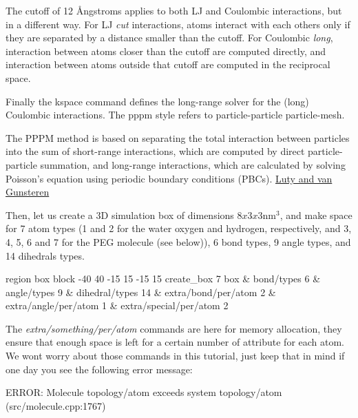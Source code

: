 \begin{tcolorbox}[colback=mylightblue!5!white,colframe=mylightblue!75!black,title=About cutoff in molecular dynamics]
The cutoff of 12 Ångstroms applies to both LJ and Coulombic
interactions, but in a different way. For LJ \textit{cut}
interactions, atoms interact with each others only if they
are separated by a distance smaller than the cutoff. For
Coulombic \textit{long}, interaction between atoms closer than
the cutoff are computed directly, and interaction between
atoms outside that cutoff are computed in the reciprocal
space.
\end{tcolorbox}

\noindent Finally the kspace command defines the long-range solver for the (long)
Coulombic interactions. The pppm style refers to
particle-particle particle-mesh.

\begin{tcolorbox}[colback=mylightblue!5!white,colframe=mylightblue!75!black,title=Background Information (optional) -- About PPPM]
The PPPM
method is based on separating the total interaction
between particles into the sum of short-range
interactions, which are computed by direct
particle-particle summation, and long-range interactions,
which are calculated by solving Poisson's equation using
periodic boundary conditions (PBCs). 
\href{https://doi.org/10.1021/jp9518623}{Luty and van Gunsteren}
\end{tcolorbox}

\noindent Then, let us create a 3D simulation box of dimensions $8 x 3 x 3 \text{nm}^3$,
and make space for 7 atom types (1 and 2 for
the water oxygen and hydrogen, respectively, and 3, 4, 5, 6
and 7 for the PEG molecule (see below)), 6 bond types, 9
angle types, and 14 dihedrals types.

\begin{lcverbatim}
region box block -40 40 -15 15 -15 15
create_box 7 box &
bond/types 6 &
angle/types 9 &
dihedral/types 14 &
extra/bond/per/atom 2 &
extra/angle/per/atom 1 &
extra/special/per/atom 2
\end{lcverbatim}

\noindent \begin{tcolorbox}[colback=mylightblue!5!white,colframe=mylightblue!75!black,title=About extra per atom commands]
The \textit{extra/something/per/atom} commands are here for
memory allocation, they ensure that enough space is left for a
certain number of attribute for each atom. We wont worry
about those commands in this tutorial, just keep that in mind if one day you see the following
error message:
\begin{lcverbatim}
ERROR: Molecule topology/atom exceeds system topology/atom (src/molecule.cpp:1767)
\end{lcverbatim}

\noindent \end{tcolorbox}

